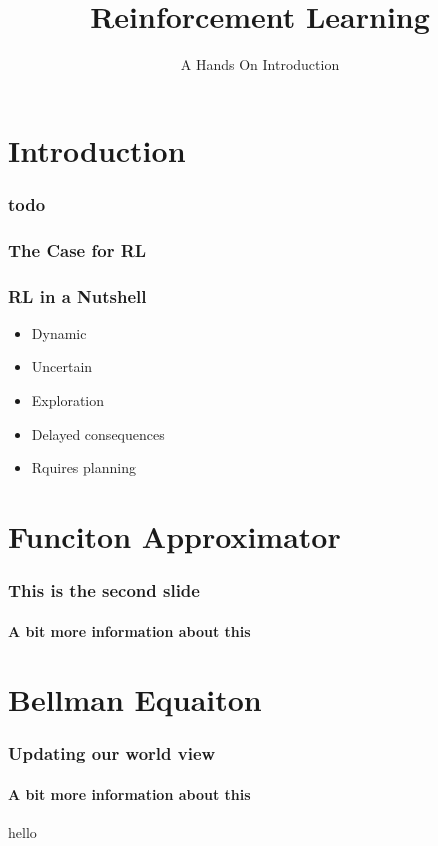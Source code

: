 \documentclass{beamer}
\begin{document}
\title{Reinforcement Learning}
\subtitle{A Hands On Introduction}
\frame{\titlepage}

\section{Introduction}
\begin{frame}
  \frametitle{todo}
  \tableofcontents[currentsection]
\end{frame}

\begin{frame}
  \frametitle{The Case for RL}
  
\end{frame} 

\begin{frame}
  \frametitle{RL in a Nutshell}
  \begin{itemize}
  \item Dynamic
  \item Uncertain
  \item Exploration
  \item Delayed consequences
  \item Rquires planning
  \end{itemize} 
\end{frame}



\section{Funciton Approximator}


\begin{frame}
  \frametitle{This is the second slide}
  \framesubtitle{A bit more information about this}
\end{frame}

\section{Bellman Equaiton}
\begin{frame}
  \frametitle{Updating our world view}
  \framesubtitle{A bit more information about this}
  \begin{block}{hello}
    \inputminted[firstline=21, lastline=22, autogobble,breaklines]{python}{../updates.py}
  \end{block}
\end{frame}
\end{document}
